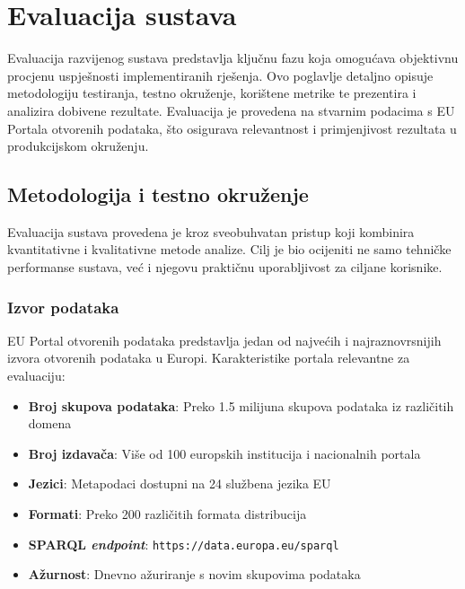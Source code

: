 \chapter{Evaluacija sustava}
\label{ch:evaluation}


Evaluacija razvijenog sustava predstavlja ključnu fazu koja omogućava objektivnu procjenu uspješnosti implementiranih rješenja. Ovo poglavlje detaljno opisuje metodologiju testiranja, testno okruženje, korištene metrike te prezentira i analizira dobivene rezultate. Evaluacija je provedena na stvarnim podacima s EU Portala otvorenih podataka, što osigurava relevantnost i primjenjivost rezultata u produkcijskom okruženju.

\section{Metodologija i testno okruženje}

Evaluacija sustava provedena je kroz sveobuhvatan pristup koji kombinira kvantitativne i kvalitativne metode analize. Cilj je bio ocijeniti ne samo tehničke performanse sustava, već i njegovu praktičnu uporabljivost za ciljane korisnike.

\subsection{Izvor podataka}

EU Portal otvorenih podataka predstavlja jedan od najvećih i najraznovrsnijih izvora otvorenih podataka u Europi. Karakteristike portala relevantne za evaluaciju:

\begin{itemize}
    \item \textbf{Broj skupova podataka}: Preko 1.5 milijuna skupova podataka iz različitih domena
    \item \textbf{Broj izdavača}: Više od 100 europskih institucija i nacionalnih portala
    \item \textbf{Jezici}: Metapodaci dostupni na 24 službena jezika EU
    \item \textbf{Formati}: Preko 200 različitih formata distribucija
    \item \textbf{SPARQL \textit{endpoint}}: \texttt{https://data.europa.eu/sparql}
    \item \textbf{Ažurnost}: Dnevno ažuriranje s novim skupovima podataka
\end{itemize}

